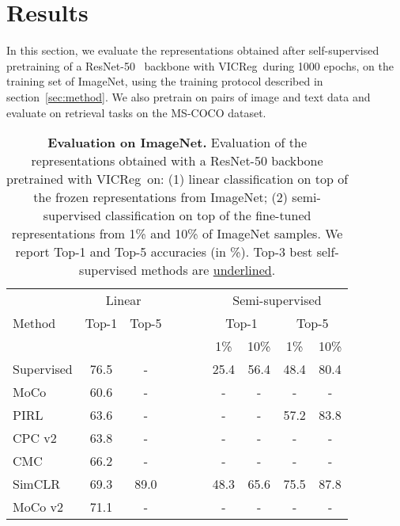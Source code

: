 \documentclass{article}
\newcommand{\algo}{VICReg}
\begin{document}
\section{Results}
In this section, we evaluate the representations obtained after self-supervised pretraining of a ResNet-50~\cite{he2016resnet} backbone with \algo \ during 1000 epochs, on the training set of ImageNet, using the training protocol described in section~\ref{sec:method}. We also pretrain on pairs of image and text data and evaluate on retrieval tasks on the MS-COCO dataset.
\begin{table}[t]
\setlength{\tabcolsep}{7pt}
\centering
    \caption{\textbf{Evaluation on ImageNet.} Evaluation of the representations obtained with a ResNet-50 backbone pretrained with \algo \ on: (1) linear classification on top of the frozen representations from ImageNet; (2) semi-supervised classification on top of the fine-tuned representations from 1\% and 10\% of ImageNet samples. We report Top-1 and Top-5 accuracies (in \%). Top-3 best self-supervised methods are \underline{underlined}.}
    \label{tab:imagenet_evaluation}
    \vspace{-0.5em}
    \begin{tabular}{ @{} l cc c cccc @{} }
      \toprule
 & \multicolumn{2}{c}{Linear}  &~~~~& \multicolumn{4}{c}{Semi-supervised} \\
 \cmidrule{2-3}\cmidrule{5-8}
 Method                     & Top-1 & Top-5 && \multicolumn{2}{c}{Top-1} & \multicolumn{2}{c}{Top-5} \\
	                                            &        &        && 1\% & 10\% & 1\% & 10\% \\      
      \midrule
	    Supervised                              & 76.5 & -      && 25.4 & 56.4 & 48.4 & 80.4 \\
      \midrule
	    MoCo~\cite{he2020moco}                  & 60.6 & -      && -      & -      & -      & - \\
	    PIRL~\cite{misra2020pirl}               & 63.6 & -      && -      & -      & 57.2 & 83.8 \\
	    CPC v2 \cite{henaff2019data}            & 63.8 & -      && -      & -      & -      & - \\
	    CMC \cite{tian2019cmc}                  & 66.2 & -      && -      & -      & -      & - \\
	    SimCLR~\cite{chen2020simclr}            & 69.3 & 89.0   && 48.3 & 65.6 & 75.5 & 87.8 \\
	    MoCo v2~\cite{chen2020mocov2}           & 71.1 & -      && -      & -      & -      & - \\

\end{tabular}
\end{table}
\end{document}
